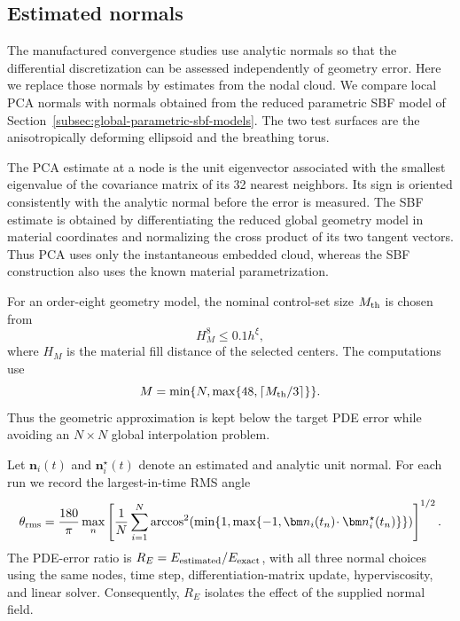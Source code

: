\documentclass[a4paper,fleqn]{cas-sc}
\begin{document}
\subsection{Estimated normals}
\label{subsec:normal-estimation-results}

The manufactured convergence studies use analytic normals so that the
differential discretization can be assessed independently of geometry error.
Here we replace those normals by estimates from the nodal cloud.  We compare
local PCA normals with normals obtained from the reduced parametric SBF model
of Section~\ref{subsec:global-parametric-sbf-models}.  The two test surfaces
are the anisotropically deforming ellipsoid and the breathing torus.

The PCA estimate at a node is the unit eigenvector associated with the smallest
eigenvalue of the covariance matrix of its 32 nearest neighbors.  Its sign is
oriented consistently with the analytic normal before the error is measured.
The SBF estimate is obtained by differentiating the reduced global geometry
model in material coordinates and normalizing the cross product of its two
tangent vectors.  Thus PCA uses only the instantaneous embedded cloud, whereas
the SBF construction also uses the known material parametrization.

For an order-eight geometry model, the nominal control-set size
\(M_{\rm th}\) is chosen from
\[
  H_M^8\le 0.1h^\xi,
\]
where \(H_M\) is the material fill distance of the selected centers.  The
computations use
\[
  M=\min\{N,\max\{48,\lceil M_{\rm th}/3\rceil\}\}.
\]
Thus the geometric approximation is kept below the target PDE error while
avoiding an \(N\times N\) global interpolation problem.

Let \(\bm n_i(t)\) and \(\bm n_i^\star(t)\) denote an estimated and analytic
unit normal.  For each run we record the largest-in-time RMS angle
\[
  \theta_{\rm rms}
  =
  \frac{180}{\pi}\max_n
  \left[
    \frac{1}{N}\sum_{i=1}^N
    \arccos^2\!\left(
      \min\{1,\max\{-1,\bm n_i(t_n)\!\cdot\bm n_i^\star(t_n)\}\}
    \right)
  \right]^{1/2}.
\]
The PDE-error ratio is
\(R_E=E_{\rm estimated}/E_{\rm exact}\), with all three normal choices using
the same nodes, time step, differentiation-matrix update, hyperviscosity, and
linear solver.  Consequently, \(R_E\) isolates the effect of the supplied
normal field.
\end{document}
